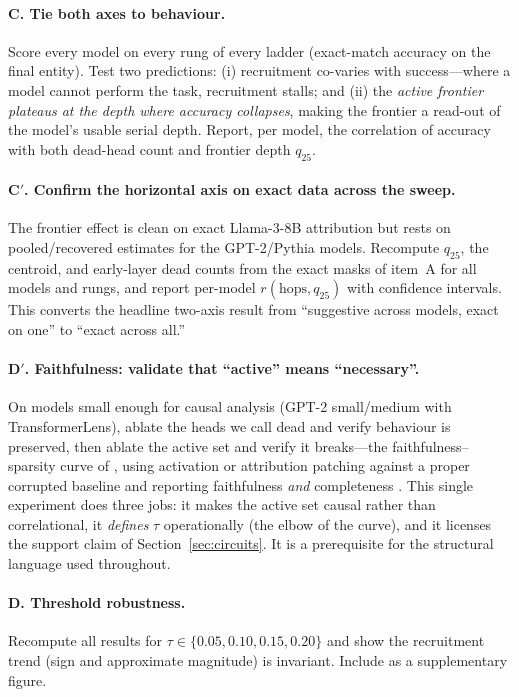 \documentclass[11pt]{article}
\begin{document}
\paragraph{C. Tie both axes to behaviour.}
Score every model on every rung of every ladder (exact-match accuracy on the
final entity). Test two predictions: (i) recruitment co-varies with
success---where a model cannot perform the task, recruitment stalls; and
(ii) the \emph{active frontier plateaus at the depth where accuracy
collapses}, making the frontier a read-out of the model's usable serial depth.
Report, per model, the correlation of accuracy with both dead-head count and
frontier depth $q_{25}$.

\paragraph{C$'$. Confirm the horizontal axis on exact data across the sweep.}
The frontier effect is clean on exact Llama-3-8B attribution but rests on
pooled/recovered estimates for the GPT-2/Pythia models. Recompute $q_{25}$,
the centroid, and early-layer dead counts from the exact masks of item~A for
all models and rungs, and report per-model $r(\text{hops},q_{25})$ with
confidence intervals. This converts the headline two-axis result from
``suggestive across models, exact on one'' to ``exact across all.''

\paragraph{D$'$. Faithfulness: validate that ``active'' means ``necessary''.}
On models small enough for causal analysis (GPT-2 small/medium with
TransformerLens), ablate the heads we call dead and verify behaviour is
preserved, then ablate the active set and verify it breaks---the
faithfulness--sparsity curve of \citet{conmy2023towards}, using activation or
attribution patching \citep{nanda2023attribution,syed2023attribution} against a
proper corrupted baseline and reporting faithfulness \emph{and} completeness
\citep{hanna2024faithfulness,makelov2024illusions}. This single experiment
does three jobs: it makes the active set causal rather than correlational, it
\emph{defines} $\tau$ operationally (the elbow of the curve), and it licenses
the support claim of Section~\ref{sec:circuits}. It is a prerequisite for the
structural language used throughout.

\paragraph{D. Threshold robustness.}
Recompute all results for $\tau\in\{0.05,0.10,0.15,0.20\}$ and show the
recruitment trend (sign and approximate magnitude) is invariant. Include as a
supplementary figure.
\end{document}
